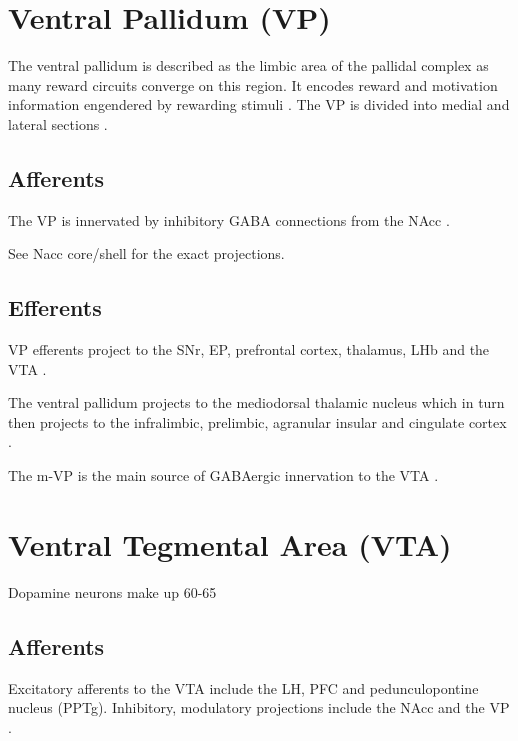\documentclass[12pt,a4paper]{article}
\let\oldsection\section
\renewcommand\section{\clearpage\oldsection}
\begin{document}
\section{Ventral Pallidum (VP)}

The ventral pallidum is described as the limbic area of the pallidal complex as
many reward circuits converge on this region. It encodes reward and motivation
information engendered by rewarding stimuli \citep{Smith2009}. The VP is divided into medial
and lateral sections \citep{Sesack2010}.

\subsection{Afferents}

The VP is innervated by inhibitory GABA connections from the
NAcc \citep{Basar2010}. 

See Nacc core/shell for the exact projections.

\subsection{Efferents}

VP efferents project to the SNr, EP, prefrontal cortex, thalamus, LHb and the VTA \citep{Groenewegen1993} \citep{Ikemoto2007}.

The ventral pallidum projects to the mediodorsal thalamic nucleus which in turn then 
projects to the infralimbic, prelimbic, agranular insular and cingulate cortex \citep{Ikemoto2007}.

The m-VP is the main source of GABAergic innervation to the VTA \citep{Sesack2010}.


\section{Ventral Tegmental Area (VTA)}

Dopamine neurons make up 60-65%

\subsection{Afferents}

Excitatory afferents to the VTA include the LH, PFC and pedunculopontine nucleus
(PPTg). Inhibitory, modulatory projections include the NAcc and the VP \citep{Sesack2010}.
\end{document}
